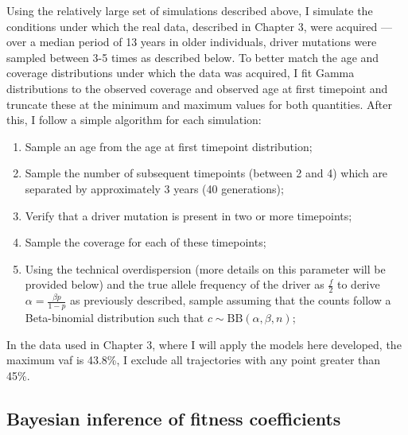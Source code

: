 Using the relatively large set of simulations described above, I simulate the conditions under which the real data, described in Chapter 3, were acquired --- over a median period of 13 years in older individuals, driver mutations were sampled between 3-5 times as described below. To better match the age and coverage distributions under which the data was acquired, I fit Gamma distributions to the observed coverage and observed age at first timepoint and truncate these at the minimum and maximum values for both quantities. After this, I follow a simple algorithm for each simulation:

\begin{enumerate}
    \item Sample an age from the age at first timepoint distribution;
    \item Sample the number of subsequent timepoints (between 2 and 4) which are separated by approximately 3 years (40 generations);
    \item Verify that a driver mutation is present in two or more timepoints;
    \item Sample the coverage for each of these timepoints;
    \item Using the technical overdispersion (more details on this parameter will be provided below) and the true allele frequency of the driver as $\frac{f}{2}$ to derive $\alpha = \frac{\beta p}{1-p}$ as previously described, sample assuming that the counts follow a Beta-binomial distribution such that $c \sim \mathrm{BB}(\alpha,\beta,n)$;
\end{enumerate}

In the data used in Chapter 3, where I will apply the models here developed, the maximum \ac{vaf} is 43.8\%, I exclude all trajectories with any point greater than 45\%.

\subsection{Bayesian inference of fitness coefficients}

